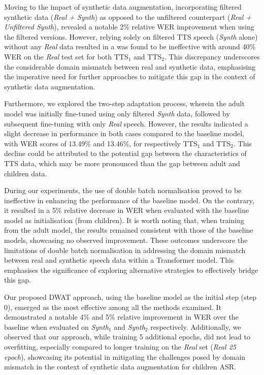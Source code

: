 Moving to the impact of synthetic data augmentation, incorporating filtered synthetic data (\textit{Real +  Synth}) as opposed to the unfiltered counterpart (\textit{Real + Unfiltered Synth}), revealed a notable 2\% relative \ac{WER} improvement when using the filtered versions. However, relying solely on filtered \ac{TTS} speech (\textit{Synth} alone) without any \textit{Real} data resulted in a was found to be ineffective with around 40\% \ac{WER} on the \textit{Real} test set for both TTS$_1$ and TTS$_2$. This discrepancy underscores the considerable domain mismatch between real and synthetic data, emphasising the imperative need for further approaches to mitigate this gap in the context of synthetic data augmentation.

Furthermore, we explored the two-step adaptation process, wherein the adult model was initially fine-tuned using only filtered \textit{Synth} data, followed by subsequent fine-tuning with only \textit{Real} speech. However, the results indicated a slight decrease in performance in both cases compared to the baseline model, with \ac{WER} scores of 13.49\% and 13.46\%, for respectively TTS$_1$ and TTS$_2$. This decline could be attributed to the potential gap between the characteristics of \ac{TTS} data, which may be more pronounced than the gap between adult and children data.


During our experiments, the use of double batch normalisation proved to be ineffective in enhancing the performance of the baseline model. On the contrary, it resulted in a 5\% relative decrease in \ac{WER}  when evaluated with the baseline model as initialisation (from children). It is worth noting that, when training from the adult model, the results remained consistent with those of the baseline models, showcasing no observed improvement. These outcomes underscore the limitations of double batch normalisation in addressing the domain mismatch between real and synthetic speech data within a Transformer model. This emphasises the significance of exploring alternative strategies to effectively bridge this gap.


Our proposed \ac{DWAT} approach, using the baseline model as the initial step (step 0), emerged as the most effective among all the methods examined. It demonstrated a notable 4\% and 5\% relative improvement in \ac{WER} over the baseline when evaluated on \textit{Synth$_1$} and \textit{Synth$_2$} respectively. Additionally, we observed that our approach, while training 5 additional epochs, did not lead to overfitting, especially compared to longer training on the \textit{Real} set (\textit{Real 25 epoch}), showcasing its potential in mitigating the challenges posed by domain mismatch in the context of synthetic data augmentation for children \ac{ASR}.


